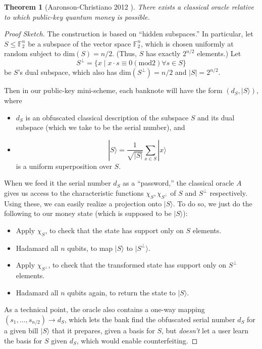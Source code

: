 \documentclass[11pt]{report}
\theoremstyle{plain}
\newtheorem{theorem}{Theorem}[section]
\theoremstyle{definition}
\renewcommand{\ket}[1]{|#1\rangle}
\begin{document}
\begin{theorem}[Aaronson-Christiano 2012 \cite{achristiano}] There exists a classical oracle relative to which public-key quantum money is possible.
\label{acthm}
\end{theorem}
\begin{proof}[Proof Sketch] The construction is based on ``hidden subspaces.''  In particular, let $S\leq \mathbb F_2^n$ be a subspace of the vector space $\mathbb F_2^n$, which is chosen uniformly at random subject to $\text{dim}(S) = n/2$.  (Thus, $S$ has exactly $2^{n/2}$ elements.)  Let
$$S^\perp = \{ x \;|\; x\cdot s\equiv 0 \left(\mathrm{mod }2\right) \forall s\in S\}$$
be $S$'s dual subspace, which also has $\text{dim}(S^\perp) = n/2$ and $\left|S\right| = 2^{n/2}$.

Then in our public-key mini-scheme, each banknote will have the form $(d_S, \ket S)$, where
\begin{itemize}
\item $d_S$ is an obfuscated classical description of the subspace $S$ and its dual subspace (which we take to be the serial number), and
\item $$\ket S =\frac {1}{\sqrt{|S|}}\sum_{x\in S} \ket{x}$$ is a uniform superposition over $S$.
\end{itemize}
When we feed it the serial number $d_S$ as a ``password,'' the classical oracle $A$ gives us access to the characteristic functions $\chi_S, \chi_{S^\perp}$ of $S$ and $S^\perp$ respectively.  Using these, we can easily realize a projection onto $\ket{S}$.  To do so, we just do the following to our money state (which is supposed to be $\ket{S}$):
\begin{itemize}
\item Apply $\chi_S$, to check that the state has support only on $S$ elements.
\item Hadamard all $n$ qubits, to map $\ket S$ to $\ket{S^\perp}$.
\item Apply $\chi_{S^\perp}$, to check that the transformed state has support only on $S^\perp$ elements.
\item Hadamard all $n$ qubits again, to return the state to $\ket S$.
\end{itemize}

As a technical point, the oracle also contains a one-way mapping $(s_1,\ldots,s_{n/2})\rightarrow d_S$, which lets the bank find the obfuscated serial number $d_S$ for a given bill $\ket S$ that it prepares, given a basis for $S$, but {\em doesn't} let a user learn the basis for $S$ given $d_S$, which would enable counterfeiting.


\end{proof}
\end{document}
